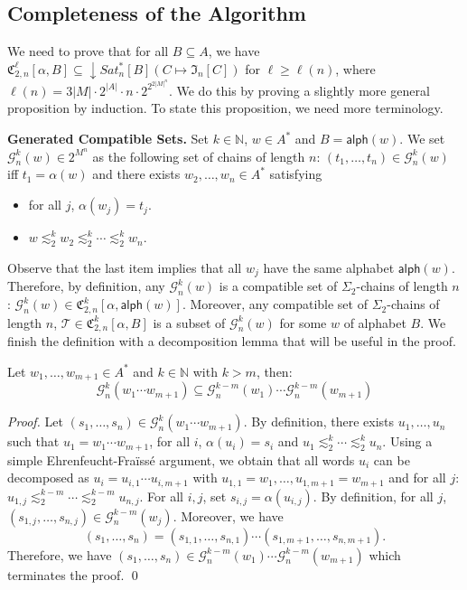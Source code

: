 \documentclass[envcountsame]{llncs}
\newcommand{\efgame}{Ehrenfeucht-Fra\"iss\'e\xspace}
\newcommand\nat{\ensuremath{\mathbb{N}}\xspace}
\newcommand\fCgen[3]{\ensuremath{\fC_{#1,#3}^{#2}}\xspace}
\newcommand\Gs{\ensuremath{\mathcal{G}}\xspace}
\newcommand\Ts{\ensuremath{\mathcal{T}}\xspace}
\newcommand{\sic}[1]{\ensuremath{\Sigma_{#1}}\xspace}
\newcommand\sieq[2]{\ensuremath{\lesssim^{#1}_{#2}}\xspace}
\newcommand\ksieq[1]{\sieq{k}{#1}}
\let\geq\geqslant
\newcommand\content[1]{\ensuremath{\contentmorphism(#1)}}
\newcommand\contentmorphism{\ensuremath{\textsf{alph}}}
\newcommand\chains{chains\xspace}
\newcommand\qchains[1]{\ensuremath{\sic{#1}}-chains\xspace}
\newcommand\dchains{\qchains{2}}
\newcommand\fI{\ensuremath{\mathfrak I}\xspace}
\newcommand\fC{\ensuremath{\mathfrak C}\xspace}
\DeclareMathOperator{\downclos}{\downarrow}
\begin{document}
\subsection{Completeness of the Algorithm}
We need to prove that for all $B \subseteq A$, we have
$\fCgen2{\ell}{n}[\alpha,B] \subseteq \downclos Sat^{*}_n[B](C \mapsto 
\fI_n[C])$ for $\ell \geq \ell(n)$, where $\ell(n)= 3|M| \cdot 2^{|A|}\cdot n \cdot
2^{2^{2|M|^n}}$. We do this by proving a slightly more general
proposition by induction. To state this proposition, we need more
terminology.

\medskip
\noindent
{\bf Generated Compatible Sets.} Set $k \in \nat$, $w \in A^*$ and $B
= \content{w}$. We set $\Gs_n^k(w) \in 2^{M^n}$ as the following set
of \chains of length $n$: $(t_1,\dots,t_{n}) \in \Gs_n^k(w)$ iff
$t_1 = \alpha(w)$ and there exists $w_2,\dots,w_{n} \in A^*$ satisfying
\begin{itemize}
\item for all $j$, $\alpha(w_j)=t_j$.
\item $w \ksieq{2} w_2 \ksieq{2} \cdots \ksieq{2} w_{n}$.
\end{itemize}
\noindent
Observe that the last item implies that all $w_j$ have the same
alphabet $\content{w}$. Therefore, by definition, any $\Gs_n^k(w)$ is a compatible set of
\dchains of length $n$: $\Gs_n^k(w) \in
\fCgen{2}{k}{n}[\alpha,\content{w}]$. Moreover, any compatible set of \dchains of
length $n$, $\Ts \in \fCgen{2}{k}{n}[\alpha,B]$ is a subset of $\Gs_n^k(w)$ for
some $w$ of alphabet $B$. We finish the definition with a decomposition lemma
that will be useful in the proof.


\begin{lemma} \label{lem:gendecomp}
  Let $w_1,\dots,w_{m+1} \in A^*$ and $k \in \nat$ with $k > m$, then: 
  \[
  \Gs_n^k(w_1\cdots w_{m+1}) \subseteq \Gs_n^{k-m}(w_1) \cdots
  \Gs_n^{k-m}(w_{m+1})
  \]
\end{lemma}


\begin{proof}
  Let $(s_1,\dots,s_n) \in \Gs_n^k(w_1\cdots w_{m+1})$. By definition,
  there exists $u_1,\dots,u_n$ such that $u_1=w_1 \cdots w_{m+1}$, for
  all $i$, $\alpha(u_i) = s_i$ and $u_1 \sieq{k}{2} \cdots \sieq{k}{2}
  u_n$. Using a simple \efgame argument, we obtain that all words $u_i$
  can be decomposed as $u_i = u_{i,1} \cdots u_{i,m+1}$ with $u_{1,1} =
  w_1,\dots,u_{1,m+1} = w_{m+1}$ and for all $j$: $u_{1,j} \sieq{k-m}{2}
  \cdots \sieq{k-m}{2} u_{n,j}$. For all $i,j$, set $s_{i,j} =
  \alpha(u_{i,j})$. By definition, for all $j$, $(s_{1,j},\dots,s_{n,j})
  \in \Gs_n^{k-m}(w_j)$. Moreover, we have 
  \[
  (s_1,\dots,s_n) = (s_{1,1},\dots,s_{n,1}) \cdots (s_{1,m+1},\dots,s_{n,m+1}).
  \]
  Therefore, we have $(s_1,\dots,s_n) \in \Gs_n^{k-m}(w_1) \cdots
  \Gs_n^{k-m}(w_{m+1})$ which terminates the proof. \qed
\end{proof}
\end{document}

